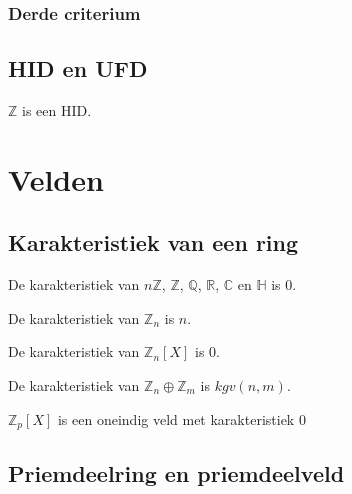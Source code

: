 \documentclass[main.tex]{subfiles}
\begin{document}
\subsubsection{Derde criterium}
\label{sec:derde-criterium}

\subsection{HID en UFD}
\label{sec:hid-en-ufd}

\begin{vb}
  $\mathbb{Z}$ is een HID.
\end{vb}





 

\section{Velden}
\label{sec:velden}

\subsection{Karakteristiek van een ring}
\label{sec:karakt-van-een}

\begin{vb}
  De karakteristiek van $n\mathbb{Z}$, $\mathbb{Z}$, $\mathbb{Q}$, $\mathbb{R}$, $\mathbb{C}$ en $\mathbb{H}$ is $0$.
\end{vb}

\begin{vb}
  De karakteristiek van $\mathbb{Z}_{n}$ is $n$.
\end{vb}

\begin{vb}
  De karakteristiek van $\mathbb{Z}_{n}[X]$ is $0$.
\end{vb}

\begin{vb}
  De karakteristiek van $\mathbb{Z}_{n} \oplus \mathbb{Z}_{m}$ is $kgv(n,m)$.
\end{vb}

\begin{vb}
  $\mathbb{Z}_{p}[X]$ is een oneindig veld met karakteristiek $0$
\end{vb}


\subsection{Priemdeelring en priemdeelveld}
\label{sec:priemd-en-priemd}
\end{document}
